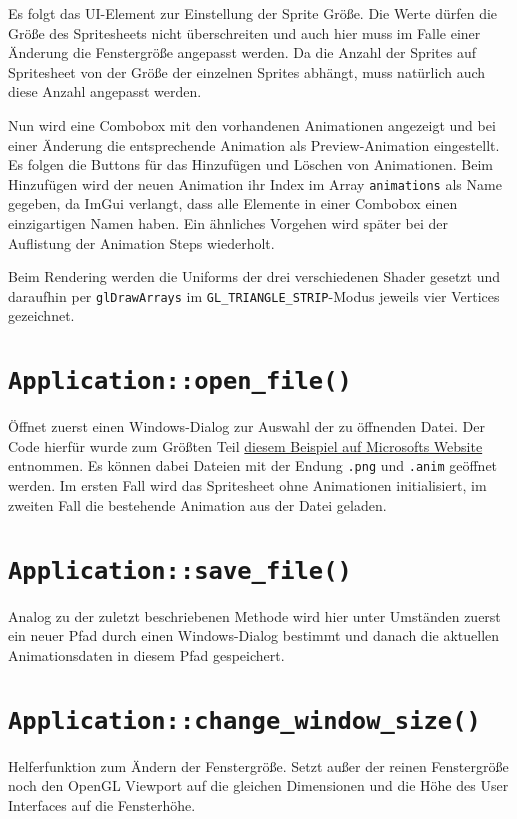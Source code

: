 Es folgt das UI-Element zur Einstellung der Sprite Größe. Die Werte dürfen die Größe des Spritesheets nicht überschreiten und auch hier muss im Falle einer Änderung die Fenstergröße angepasst werden. Da die Anzahl der Sprites auf Spritesheet von der Größe der einzelnen Sprites abhängt, muss natürlich auch diese Anzahl angepasst werden. 

Nun wird eine Combobox mit den vorhandenen Animationen angezeigt und bei einer Änderung die entsprechende Animation als Preview-Animation eingestellt. Es folgen die Buttons für das Hinzufügen und Löschen von Animationen. Beim Hinzufügen wird der neuen Animation ihr Index im Array \lstinline{animations} als Name gegeben, da ImGui verlangt, dass alle Elemente in einer Combobox einen einzigartigen Namen haben. Ein ähnliches Vorgehen wird später bei der Auflistung der Animation Steps wiederholt. 

Beim Rendering werden die Uniforms der drei verschiedenen Shader gesetzt und daraufhin per \lstinline{glDrawArrays} im \lstinline{GL_TRIANGLE_STRIP}-Modus jeweils vier Vertices gezeichnet. 

\section{\lstinline{Application::open_file()}}
Öffnet zuerst einen Windows-Dialog zur Auswahl der zu öffnenden Datei. Der Code hierfür wurde zum Größten Teil \href{https://docs.microsoft.com/en-us/windows/win32/learnwin32/example--the-open-dialog-box}{diesem Beispiel auf Microsofts Website} entnommen. Es können dabei Dateien mit der Endung \lstinline{.png} und \lstinline{.anim} geöffnet werden. Im ersten Fall wird das Spritesheet ohne Animationen initialisiert, im zweiten Fall die bestehende Animation aus der Datei geladen. 

\section{\lstinline{Application::save_file()}}
Analog zu der zuletzt beschriebenen Methode wird hier unter Umständen zuerst ein neuer Pfad durch einen Windows-Dialog bestimmt und danach die aktuellen Animationsdaten in diesem Pfad gespeichert.

\section{\lstinline{Application::change_window_size()}}
Helferfunktion zum Ändern der Fenstergröße. Setzt außer der reinen Fenstergröße noch den OpenGL Viewport auf die gleichen Dimensionen und die Höhe des User Interfaces auf die Fensterhöhe.